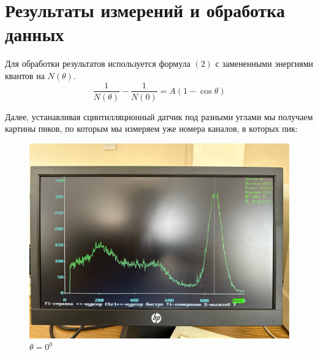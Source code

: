 \documentclass[a4paper, 12pt]{article}
\begin{document}
    
    
\section{Результаты измерений и обработка данных} 

Для обработки результатов используется формула $(2)$ с замененными энергиями квантов на $N(\theta)$.
\begin{equation}
    \frac{1}{N(\theta)} - \frac{1}{N(0)} = A(1-\cos\theta)
\end{equation}

Далее, устанавливая сцинтилляционный датчик под разными углами мы получаем картины пиков, 
по которым мы измеряем уже номера каналов, в которых пик:

    \begin{figure}[H]
        \centering
        \includegraphics[width = 0.6\linewidth]{res/01.jpg}
        \caption{$\theta = 0^0$}
    \end{figure}
\end{document}

